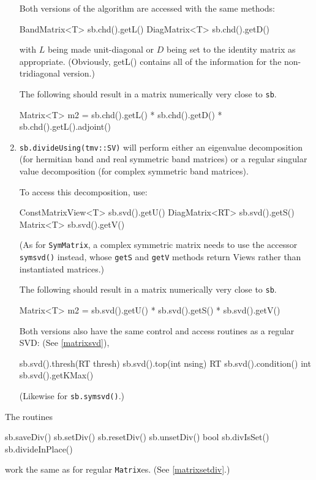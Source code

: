 \documentclass[twoside,letterpaper,11pt]{article}
\renewcommand{\tt}[1]{{\lstinline {#1}}}
\begin{document}
\begin{enumerate}
Both versions of the algorithm are accessed with the same methods:
\begin{tmvcode}
BandMatrix<T> sb.chd().getL()
DiagMatrix<T> sb.chd().getD()
\end{tmvcode}
with $L$ being made unit-diagonal or $D$ being set to the identity matrix
as appropriate.  (Obviously, getL() contains all of the information for the non-tridiagonal
version.)

The following should result in a matrix numerically very close to \tt{sb}.
\begin{tmvcode}
Matrix<T> m2 = sb.chd().getL() * sb.chd().getD() * 
      sb.chd().getL().adjoint()
\end{tmvcode}

\item
\tt{sb.divideUsing(tmv::SV)} will perform either an eigenvalue decomposition
(for hermitian band and real symmetric band matrices) or a regular singular value
decomposition (for complex symmetric band matrices).

To access this decomposition, use:
\begin{tmvcode}
ConstMatrixView<T> sb.svd().getU()
DiagMatrix<RT> sb.svd().getS()
Matrix<T> sb.svd().getV()
\end{tmvcode}
(As for \tt{SymMatrix}, a complex symmetric matrix needs to use the accessor
\tt{symsvd()} instead, whose \tt{getS} and \tt{getV} methods return Views
rather than instantiated matrices.)

The following should result in a matrix numerically very close to \tt{sb}.
\begin{tmvcode}
Matrix<T> m2 = sb.svd().getU() * sb.svd().getS() * sb.svd().getV()
\end{tmvcode}

Both versions also have the same control and access routines as a regular SVD:
(See \ref{matrixsvd}),
\begin{tmvcode}
sb.svd().thresh(RT thresh)
sb.svd().top(int nsing)
RT sb.svd().condition()
int sb.svd().getKMax()
\end{tmvcode}
(Likewise for \tt{sb.symsvd()}.)

\end{enumerate}
The routines 
\begin{tmvcode}
sb.saveDiv()
sb.setDiv()
sb.resetDiv()
sb.unsetDiv()
bool sb.divIsSet()
sb.divideInPlace()
\end{tmvcode}
work the same as for regular \tt{Matrix}es.
(See \ref{matrixsetdiv}.)
\end{document}
